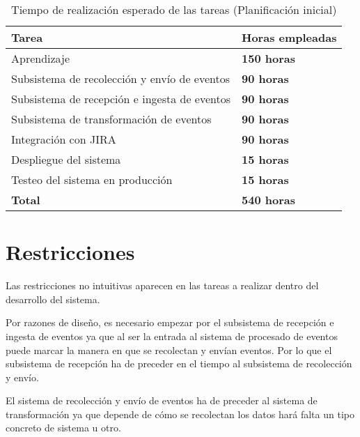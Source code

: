 \begin{table}[H]\label{tab:tiempoplanini}
	\centering
	\begin{tabular}{|l|l|}
		\hline
		\textbf{Tarea}                               & \textbf{Horas empleadas}                  \\ \hline
		Aprendizaje                                  & \textbf{150 horas}                        \\ \hline
		Subsistema de recolección y envío de eventos & \textbf{90 horas}                         \\ \hline
		Subsistema de recepción e ingesta de eventos & \textbf{90 horas}                         \\ \hline
		Subsistema de transformación de eventos      & \textbf{90 horas}                         \\ \hline
		Integración con JIRA                         & \textbf{90 horas}                         \\ \hline
		Despliegue del sistema                       & \textbf{15 horas}                         \\ \hline
		Testeo del sistema en producción             & \textbf{15 horas}                         \\ \hline
		\textbf{Total}                               & \textbf{540 horas}                        \\ \hline
	\end{tabular}
	\caption{Tiempo de realización esperado de las tareas (Planificación inicial)}
\end{table}

\section{Restricciones}\label{sec:restriccionesini}
Las restricciones no intuitivas aparecen en las tareas a realizar dentro del desarrollo del sistema. 

Por razones de diseño, es necesario empezar por el subsistema de recepción e ingesta de eventos ya que al ser la entrada al sistema de procesado de eventos puede marcar la manera en que se recolectan y envían eventos. Por lo que el subsistema de recepción ha de preceder en el tiempo al subsistema de recolección y envío.

El sistema de recolección y envío de eventos ha de preceder al sistema de transformación ya que depende de cómo se recolectan los datos hará falta un tipo concreto de sistema u otro.

